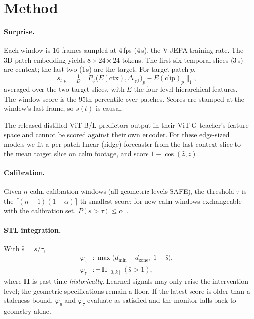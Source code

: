 \documentclass[11pt]{article}
\begin{document}
\section{Method}
\label{sec:method}

\paragraph{Surprise.} Each window is 16 frames sampled at 4\,fps (4\,s), the
V-JEPA training rate. The 3D patch embedding yields $8 \times 24 \times 24$
tokens. The first six temporal slices (3\,s) are context; the last two (1\,s)
are the target. For target patch $p$,
\begin{equation}
  s_{t,p} = \tfrac{1}{D}\bigl\lVert P_\phi\bigl(E(\text{ctx}), \Delta_{\text{tgt}}\bigr)_p
            - E(\text{clip})_p \bigr\rVert_1 ,
\end{equation}
averaged over the two target slices, with $E$ the four-level hierarchical
features. The window score is the 95th percentile over patches. Scores are
stamped at the window's last frame, so $s(t)$ is causal.

The released distilled ViT-B/L predictors output in their ViT-G teacher's
feature space and cannot be scored against their own encoder. For these
edge-sized models we fit a per-patch linear (ridge) forecaster from the last
context slice to the mean target slice on calm footage, and score
$1 - \cos(\hat{z}, z)$.

\paragraph{Calibration.} Given $n$ calm calibration windows (all geometric
levels SAFE), the threshold $\tau$ is the $\lceil (n+1)(1-\alpha) \rceil$-th
smallest score; for new calm windows exchangeable with the calibration set,
$P(s > \tau) \le \alpha$~\citep{vovk2005algorithmic,angelopoulos2021gentle}.

\paragraph{STL integration.} With $\hat s = s/\tau$,
\begin{align}
  \varphi_6 &: \max\bigl(d_{\min} - d_{\text{zone}},\; 1 - \hat s\bigr), \\
  \varphi_7 &: \lnot\, \mathbf{H}_{[0,k]}\,(\hat s > 1),
\end{align}
where $\mathbf{H}$ is past-time \emph{historically}. Learned signals may only
raise the intervention level; the geometric specifications remain a floor. If
the latest score is older than a staleness bound, $\varphi_6$ and $\varphi_7$
evaluate as satisfied and the monitor falls back to geometry alone.
\end{document}
